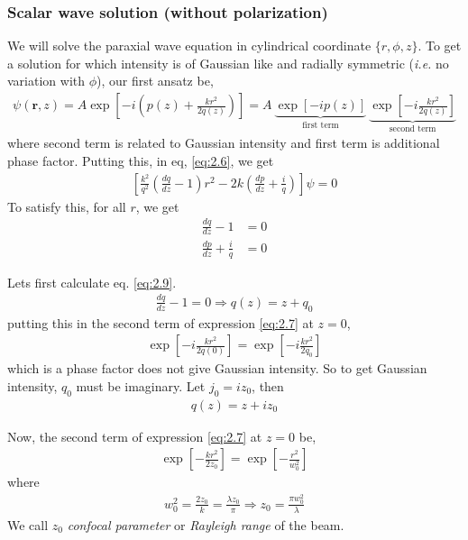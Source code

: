 \documentclass[11pt,a4paper]{article}
\numberwithin{equation}{section}
\begin{document}
\subsubsection{Scalar wave solution (without polarization)}
We will solve the paraxial wave equation in cylindrical coordinate $\{r,\phi,z \}$.\cite{cornell}
To get a solution for which intensity is of Gaussian like and radially symmetric (\textit{i.e.} no variation with $\phi$), our first ansatz be,\cite{kogelnik 66}\cite{cornell}
\begin{align}
	\psi(\boldsymbol{r},z)= A \exp\left[-i\left(p(z) + \frac{kr^2}{2q(z)}\right)\right]
	=A\:\underbrace{\exp\left[-ip(z)\right]}_{\text{first term}} \:\underbrace{\exp\left[-i\frac{kr^2}{2q(z)}\right]} _{\text{second term}} \label{eq:2.7}
\end{align} 
where second term is related to Gaussian intensity and first term is additional phase factor. Putting this, in eq, \ref{eq:2.6}, we get
\begin{align}
	\left[\frac{k^2}{q^2}\left(\frac{dq}{dz}-1\right)r^2 -2k\left(\frac{dp}{dz}+\frac{i}{q}\right)\right]\psi= 0
\end{align}
To satisfy this, for all $r$, we get
\begin{align}
	\frac{dq}{dz}-1 &=0 \label{eq:2.9}\\
	\frac{dp}{dz}+\frac{i}{q} &=0\label{eq:2.10}
\end{align}

Lets first calculate eq. \ref{eq:2.9}.
\begin{align}
	\frac{dq}{dz}-1 =0 
	\Rightarrow q(z) = z + q_0 \label{eq:2.11}
\end{align}
putting this in the second term of expression \ref{eq:2.7} at $z=0$,
\begin{align}
	\exp\left[-i\frac{kr^2}{2q(0)}\right] = \exp\left[-i\frac{kr^2}{2q_0}\right]
\end{align}
which is a phase factor does not give Gaussian intensity. So to get Gaussian intensity, $q_0$ must be imaginary. Let $j_0=iz_0$, then 
\begin{align}
	\boxed{q(z) = z + iz_0} \label{eq:2.13}
\end{align}

Now, the second term of expression \ref{eq:2.7} at $z=0$ be,
\begin{align}
	\exp\left[-\frac{kr^2}{2z_0}\right] = \exp\left[-\frac{r^2}{w_0^2}\right]
\end{align}
where
\begin{align}
	w_0^2=\frac{2z_0}{k}=\frac{\lambda z_0}{\pi}
	\Rightarrow \boxed{z_0 = \frac{\pi w_0^2}{\lambda} }
\end{align}
We call $z_0$ \textit{confocal parameter} or \textit{Rayleigh range} of the beam.
\end{document}
